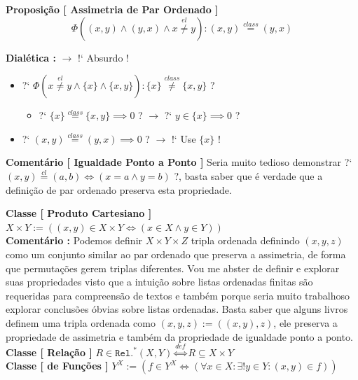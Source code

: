 \documentclass[10pt,a4paper]{report}
\begin{document}
\textbf{Proposição [ Assimetria de Par Ordenado ]} $$ \Phi( (x,y) \wedge (y,x) \wedge x \overset{el}{\ne} y ) : ( x ,y ) \overset{class}{=} (y,x) $$

\textbf{Dialética :} $\rightarrow$ !` Absurdo !

\begin{itemize}
	\item[ ] ?` $ \Phi( x \overset{el}{\ne} y \wedge \{x\} \wedge \{x,y\} ) : \{x\} \overset{class}{\ne} \{x,y\} $  ?
	\begin{itemize}
		\item[ ] ?` $ \{x\} \overset{class}{=} \{x,y\} \implies 0 $ ? $\rightarrow$ ?` $ y \in \{x\} \implies 0 $ ?
	\end{itemize}
	\item[ ] ?` $ (x,y) \overset{class}{=} (y,x) \implies 0 $ ? $\rightarrow$ !` Use $\{x\}$ !
\end{itemize}

\textbf{Comentário [ Igualdade Ponto a Ponto ]} Seria muito tedioso demonstrar ?` $ (x,y) \overset{cl}{=} (a,b) \iff (x = a \wedge y = b) $ ?, basta saber que é verdade que a definição de par ordenado preserva esta propriedade.

\hspace{\baselineskip}

\textbf{Classe [ Produto Cartesiano ]} $ X \times Y := ( (x,y) \in X \times Y \iff ( x\in X \wedge y \in Y ) ) $\\

\textbf{Comentário :} Podemos definir $ X \times Y \times Z $ tripla ordenada definindo $ (x,y,z) $ como um conjunto similar ao par ordenado que preserva a assimetria, de forma que permutações gerem triplas diferentes. Vou me abster de definir e explorar suas propriedades visto que a intuição sobre listas ordenadas finitas são requeridas para compreensão de textos e também porque seria muito trabalhoso explorar conclusões óbvias sobre listas ordenadas. Basta saber que alguns livros definem uma tripla ordenada como $ (x,y,z) := ( (x,y),z ) $, ele preserva a propriedade de assimetria e também da propriedade de igualdade ponto a ponto.\\

\textbf{Classe [ Relação ]} $ R \in \texttt{Rel.}^*(X,Y) \overset{def}{\iff} R \subseteq X \times Y $\\

\textbf{Classe [ de Funções ]} $ Y^X := ( f \in Y^X \iff ( \forall x \in X: \exists ! y \in Y : (x,y) \in f ) ) $\\
\end{document}

